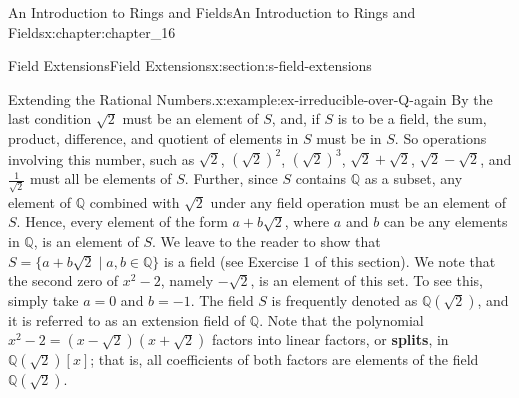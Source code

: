 \documentclass[oneside,10pt,]{book}
\newcommand{\xreffont}{\relax}
\newcommand{\terminology}[1]{\textbf{#1}}
\numberwithin{equation}{section}
\begin{document}
\begin{chapterptx}{An Introduction to Rings and Fields}{}{An Introduction to Rings and Fields}{}{}{x:chapter:chapter_16}
\begin{sectionptx}{Field Extensions}{}{Field Extensions}{}{}{x:section:s-field-extensions}
\begin{example}{Extending the Rational Numbers.}{x:example:ex-irreducible-over-Q-again}
By the last condition  \(\sqrt{2}\) must be an element of \(S\), and, if \(S\) is to be a field, the sum, product, difference, and quotient of elements in \(S\) must be in \(S\). So operations involving this number, such as  \(\sqrt{2}\), \(\left(\sqrt{2}\right)^2\), \(\left(\sqrt{2}\right)^3\), \(\sqrt{2}+\sqrt{2}\), \(\sqrt{2}-\sqrt{2}\), and \(\frac{1}{\sqrt{2}}\)  must all be elements of \(S\).   Further, since \(S\) contains \(\mathbb{Q}\) as a subset, any element of \(\mathbb{Q}\) combined with \(\sqrt{2}\) under any field operation must be an element of \(S\). Hence, every element of the form \(a + b \sqrt{2}\), where \(a\) and \(b\) can be any elements in \(\mathbb{Q}\), is an element of \(S\). We leave to the reader to show that \(S =\{a + b \sqrt{2} \mid a, b \in \mathbb{Q}\}\) is a field (see Exercise 1 of this section). We note that the second zero of \(x^2 - 2\), namely  \(-\sqrt{2}\), is an element of this set. To see this, simply take \(a = 0\) and \(b = -1\). The field \(S\) is frequently denoted as \(\mathbb{Q}\left(\sqrt{2}\right)\), and it is referred to as an extension field of \(\mathbb{Q}\).  Note that the polynomial \(x^2-2=\left(x-\sqrt{2}\right)\left(x+\sqrt{2}\right)\) factors into linear factors, or \terminology{splits}, in \(\mathbb{Q}\left(\sqrt{2}\right)[x]\); that is, all coefficients of both factors are elements of the field \(\mathbb{Q}\left(\sqrt{2}\right)\).%
\end{example}
\end{sectionptx}
\end{chapterptx}
\end{document}
